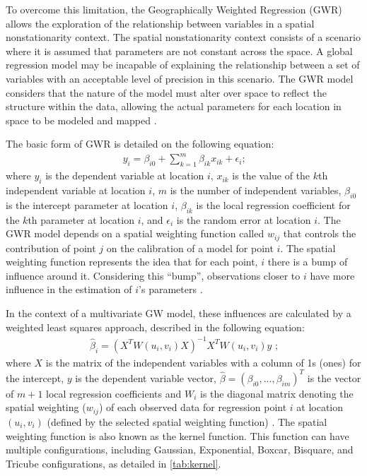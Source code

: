 
To overcome this limitation, the Geographically Weighted Regression (GWR) allows the exploration of the relationship between variables in a spatial nonstationarity context. The spatial nonstationarity context consists of a scenario where it is assumed that parameters are not constant across the space. A global regression model may be incapable of explaining the relationship between a set of variables with an acceptable level of precision in this scenario. The GWR model considers that the nature of the model must alter over space to reflect the structure within the data, allowing the actual parameters for each location in space to be modeled and mapped \cite{Brunsdon2010}.

The basic form of GWR is detailed on the following equation:\begin{align}
    y_i = \beta_{i0} + \sum_{k=1}^{m} \beta_{ik} x_{ik} + \epsilon_i \mbox{;}
    \label{eq:gwr}
\end{align} where $y_i$ is the dependent variable at location $i$, $x_{ik}$ is the value of the $k$th independent variable at location $i$, $m$ is the number of independent variables, $\beta_{i0}$ is the intercept parameter at location $i$, $\beta_{ik}$ is the local regression coefficient for the $k$th parameter at location $i$, and $\epsilon_i$ is the random error at location $i$. The GWR model depends on a spatial weighting function called $w_{ij}$ that controls the contribution of point $j$ on the calibration of a model for point $i$. The spatial weighting function represents the idea that for each point, $i$ there is a bump of influence around it. Considering this ``bump'', observations closer to $i$ have more influence in the estimation of $i$'s parameters \cite{Brunsdon2010,Gollini2013}.

In the context of a multivariate GW model, these influences are calculated by a weighted least squares approach, described in the following equation: \begin{align}
    \hat{\beta}_i = \left(X^TW\left(u_i,v_i\right)X\right)^{-1}X^TW\left(u_i, v_i \right)y\mbox{ ;}
    \label{eq:wls}
\end{align} where $X$ is the matrix of the independent variables with a column of 1s (ones) for the intercept, $y$ is the dependent variable vector, $\hat{\beta} = \left(\beta_{i0},...,\beta_{im}\right)^T$ is the vector of $m + 1$ local regression coefficients and $W_i$ is the diagonal matrix denoting the spatial weighting ($w_{ij}$) of each observed data for regression point $i$ at location $(u_i, v_i)$ (defined by the selected spatial weighting function) \cite{Gollini2013}. The spatial weighting function is also known as the kernel function. This function can have multiple configurations, including Gaussian, Exponential, Boxcar, Bisquare, and Tricube configurations, as detailed in \autoref{tab:kernel}.

